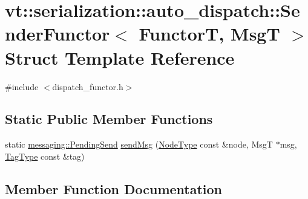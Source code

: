 \hypertarget{structvt_1_1serialization_1_1auto__dispatch_1_1_sender_functor}{}\section{vt\+:\+:serialization\+:\+:auto\+\_\+dispatch\+:\+:Sender\+Functor$<$ FunctorT, MsgT $>$ Struct Template Reference}
\label{structvt_1_1serialization_1_1auto__dispatch_1_1_sender_functor}


{\ttfamily \#include $<$dispatch\+\_\+functor.\+h$>$}

\subsection*{Static Public Member Functions}
\begin{DoxyCompactItemize}
\item 
static \hyperlink{structvt_1_1messaging_1_1_pending_send}{messaging\+::\+Pending\+Send} \hyperlink{structvt_1_1serialization_1_1auto__dispatch_1_1_sender_functor_aadddc45b4e21741933b3293c655b2b16}{send\+Msg} (\hyperlink{namespacevt_a866da9d0efc19c0a1ce79e9e492f47e2}{Node\+Type} const \&node, MsgT $\ast$msg, \hyperlink{namespacevt_a84ab281dae04a52a4b243d6bf62d0e52}{Tag\+Type} const \&tag)
\end{DoxyCompactItemize}


\subsection{Member Function Documentation}
\mbox{\label{structvt_1_1serialization_1_1auto__dispatch_1_1_sender_functor_aadddc45b4e21741933b3293c655b2b16}} 
